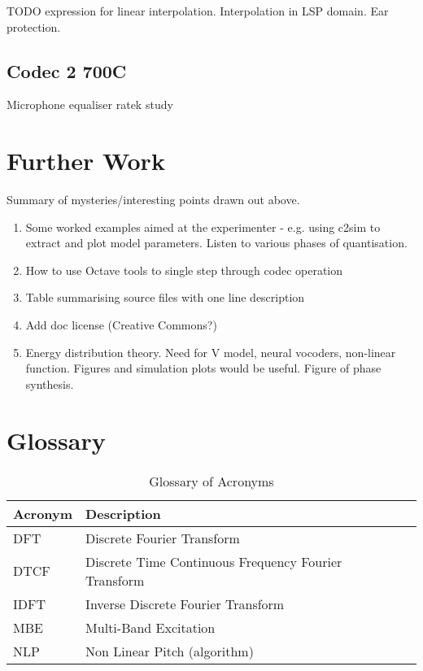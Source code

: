 \documentclass{article}
\begin{document}
TODO expression for linear interpolation.  Interpolation in LSP domain.  Ear protection.

\subsection{Codec 2 700C}
\label{sect:mode_newamp1}

Microphone equaliser
ratek study

\section{Further Work}

Summary of mysteries/interesting points drawn out above.

\begin{enumerate}
\item Some worked examples aimed at the experimenter - e.g. using c2sim to extract and plot model parameters.  Listen to various phases of quantisation.
\item How to use Octave tools to single step through codec operation
\item Table summarising source files with one line description
\item Add doc license (Creative Commons?)
\item Energy distribution theory.  Need for V model, neural vocoders, non-linear function. Figures and simulation plots would be useful. Figure of phase synthesis.
\end{enumerate}

\section{Glossary}

\label{sect:glossary}
\begin{table}[H]
\label{tab:acronyms}
\centering
\begin{tabular}{l l l }
\hline
Acronym & Description \\
\hline
DFT & Discrete Fourier Transform \\
DTCF & Discrete Time Continuous Frequency Fourier Transform \\
IDFT & Inverse Discrete Fourier Transform \\
MBE & Multi-Band Excitation \\
NLP & Non Linear Pitch (algorithm) \\
\hline
\end{tabular}
\caption{Glossary of Acronyms}
\end{table}
\end{document}
